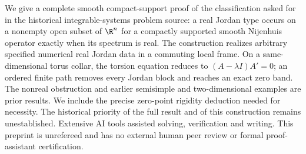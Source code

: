 We give a complete smooth compact-support proof of the classification asked
for in the historical integrable-systems problem source: a real Jordan type
occurs on a nonempty open subset of $\R^n$ for a compactly supported smooth
Nijenhuis operator exactly when its spectrum is real. The construction
realizes arbitrary specified numerical real Jordan data in a commuting local
frame. On a same-dimensional torus collar, the torsion equation reduces to
$(A-\lambda I)A'=0$; an ordered finite path removes every Jordan block and
reaches an exact zero band. The nonreal obstruction and earlier semisimple
and two-dimensional examples are prior results. We include the precise
zero-point rigidity deduction needed for necessity. The historical priority
of the full result and of this construction remains unestablished.
Extensive AI tools assisted solving, verification and writing. This preprint
is unrefereed and has no external human peer review or formal
proof-assistant certification.
